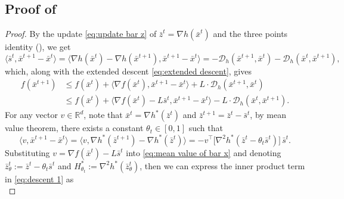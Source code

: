 \documentclass{article}
\theoremstyle{plain}
\theoremstyle{definition}
\theoremstyle{remark}
\newcommand{\Rd}{\mathbb{R}^d}
\newcommand{\sL}{L}
\newcommand{\cD}{\mathcal{D}_{h}}
\begin{document}
\subsection{Proof of \texorpdfstring{}{Lemma }}\label{proof of lem:first descent}
\begin{proof}
By the update \eqref{eq:update bar z} of $\bar z^t=\nabla h(\bar x^t)$ and the three points identity (), we get 
\[\langle \bar s^t, \bar x^{t+1} - \bar x^t \rangle = \langle \nabla h(\bar x^t) - \nabla h(\bar x^{t+1}) , \bar x^{t+1} - \bar x^t \rangle = - \cD(\bar x^{t+1},\bar x^t) - \cD(\bar x^{t},\bar x^{t+1}),\]
which, along with the extended descent \eqref{eq:extended descent}, gives
    \begin{equation}
        \label{eq:descent 1}
          \begin{aligned}
        f(\bar x^{t+1}) & \leq f(\bar x^t) + \langle \nabla f(\bar x^t) , \bar x^{t+1} - \bar x^t \rangle + \sL \cdot \cD(\bar x^{t+1},\bar x^t)\\
        &\leq f(\bar x^t) + \langle \nabla f(\bar x^t) - \sL \bar s^t, \bar x^{t+1} - \bar x^t \rangle - \sL \cdot \cD(\bar x^t,\bar x^{t+1}).
    \end{aligned}
    \end{equation}
    For any vector $v\in\Rd$, note that $\bar x^t=\nabla h^*(\bar z^t)$ and $\bar z^{t+1} = \bar z^t - \bar s^t$, by mean value theorem, there exists a constant $\theta_t\in[0,1]$ such that
    \begin{equation}\label{eq:mean value of bar x} 
       \langle v, \bar x^{t+1} - \bar x^t \rangle = \langle v,\nabla h^*(\bar z^{t+1}) - \nabla h^*(\bar z^{t}) \rangle  = -v^\top\big[\nabla^2 h^*(\bar z^t - \theta_t \bar s^t)\big]\,\bar s^t. %
    \end{equation}  
    Substituting $v=\nabla f(\bar x^t) - \sL \bar s^t$ into \eqref{eq:mean value of bar x} and
   denoting $\bar z_\theta^t:= \bar z^t - \theta_t \bar s^t$ and $ H_{\theta_t}^*:=\nabla^2 h^*(\bar z_\theta^t)$, then we can express the inner product term in \eqref{eq:descent 1} as
   \begin{equation}

\end{equation}
\end{proof}
\end{document}
